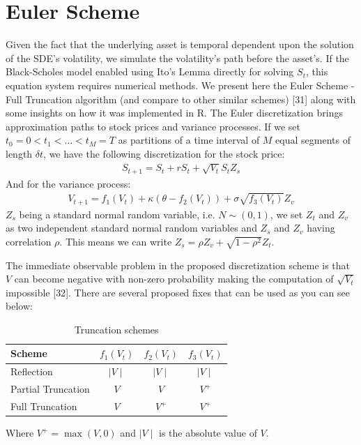 \documentclass[12pt,twoside]{reedthesis}
\theoremstyle{definition}
\theoremstyle{definition}
\theoremstyle{remark}
\begin{document}
  \section{Euler Scheme}\label{euler-scheme}
  
  Given the fact that the underlying asset is temporal dependent upon the
  solution of the SDE's volatility, we simulate the volatility's path
  before the asset's. If the Black-Scholes model enabled using Ito's Lemma
  directly for solving \(S_t\), this equation system requires numerical
  methods. We present here the Euler Scheme - Full Truncation algorithm
  (and compare to other similar schemes) {[}31{]} along with some insights
  on how it was implemented in R. The Euler discretization brings
  approximation paths to stock prices and variance processes. If we set
  \(t_0 = 0 < t_1 < \dots < t_M = T\) as partitions of a time interval of
  \(M\) equal segments of length \(\delta t\), we have the following
  discretization for the stock price:
  \begin{align}
  S_{t+1} = S_t + rS_t + \sqrt{V_t} S_t Z_s
  \end{align}
  \noindent
  And for the variance process:
  \begin{align}
  V_{t+1} = f_1(V_{t}) + \kappa (\theta - f_2(V_{t})) + \sigma \sqrt{f_3(V_{t})} Z_v 
  \end{align}
  \noindent
  \(Z_s\) being a standard normal random variable, i.e. \(N\sim(0,1)\), we
  set \(Z_t\) and \(Z_v\) as two independent standard normal random
  variables and \(Z_s\) and \(Z_v\) having correlation \(\rho\). This
  means we can write \(Z_s = \rho Z_v + \sqrt{1-\rho^2} Z_t\).
  
  The immediate observable problem in the proposed discretization scheme
  is that \(V\) can become negative with non-zero probability making the
  computation of \(\sqrt{V_t}\) impossible {[}32{]}. There are several
  proposed fixes that can be used as you can see below:
  \begin{longtable}[t]{lccc}
  \caption{\label{tab:fullt}Truncation schemes}\\
  \toprule
  Scheme & $f_1(V_{t})$ & $f_2(V_{t})$ & $f_3(V_{t})$\\
  \midrule
  Reflection & $\mid V \mid$ & $\mid V \mid$ & $\mid V \mid$\\
  Partial Truncation & $V$ & $V$ & $V^+$\\
  Full Truncation & $V$ & $V^+$ & $V^+$\\
  \bottomrule
  \end{longtable}
  Where \(V^+ = \max(V,0)\) and \(\mid V \mid\) is the absolute value of
  \(V\).
  
\end{document}
